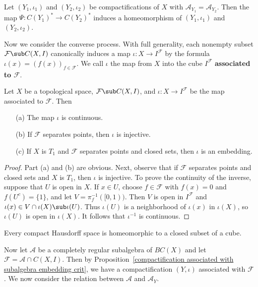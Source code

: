 \begin{corollary}\label{compactification isomorphic if same algebra}
Let $(Y_1,\iota_1)$ and $(Y_2,\iota_2)$ be compactifications of $X$ with $\mathcal{A}_{Y_1}=\mathcal{A}_{Y_2}$. Then the map $\Psi:C(Y_1)^*\to C(Y_2)^*$ induces a homeomorphism of $(Y_1,\iota_1)$ and $(Y_2,\iota_2)$.
\end{corollary}
Now we consider the converse process. With full generality, each nonempty subset $\mathcal{F}\sub C(X,I)$ canonically induces a map $\iota:X\to I^{\mathcal{F}}$ by the formula $\iota(x)=(f(x))_{f\in\mathcal{F}}$. We call $\iota$ the map from $X$ into the cube $I^\mathcal{F}$ \textbf{associated to $\mathcal{F}$}.
\begin{proposition}\label{compactification associated with subalgebra embedding crit}
Let $X$ be a topological space, $\mathcal{F}\sub C(X,I)$, and $\iota:X\to I^\mathcal{F}$ be the map associated to $\mathcal{F}$. Then
\begin{itemize}
\item[(a)] The map $\iota$ is continuous.
\item[(b)] If $\mathcal{F}$ separates points, then $\iota$ is injective.
\item[(c)] If $X$ is $T_1$ and $\mathcal{F}$ separates points and closed sets, then $\iota$ is an embedding.
\end{itemize}
\end{proposition}
\begin{proof}
Part (a) and (b) are obvious. Next, observe that if $\mathcal{F}$ separates points and closed sets and $X$ is $T_1$, then $\iota$ is injective. To prove the continuity of the inverse, suppose that $U$ is open in $X$. If $x\in U$, choose $f\in\mathcal{F}$ with $f(x)=0$ and $f(U^c)=\{1\}$, and let $V=\pi_f^{-1}([0,1))$. Then $V$ is open in $I^\mathcal{F}$ and $\iota(x)\in V\cap\iota(X)\sub\iota(U)$. Thus $\iota(U)$ is a neighborhood of $\iota(x)$ in $\iota(X)$, so $\iota(U)$ is open in $\iota(X)$. It follows that $\iota^{-1}$ is continuous.
\end{proof}
\begin{corollary}
Every compact Hausdorff space is homeomorphic to a closed subset of a cube.
\end{corollary}
Now let $\mathcal{A}$ be a completely regular subalgebra of $BC(X)$ and let $\mathcal{F}=\mathcal{A}\cap C(X,I)$. Then by Proposition~\ref{compactification associated with subalgebra embedding crit}, we have a compactification $(Y,\iota)$ associated with $\mathcal{F}$. We now consider the relation between $\mathcal{A}$ and $\mathcal{A}_Y$.
